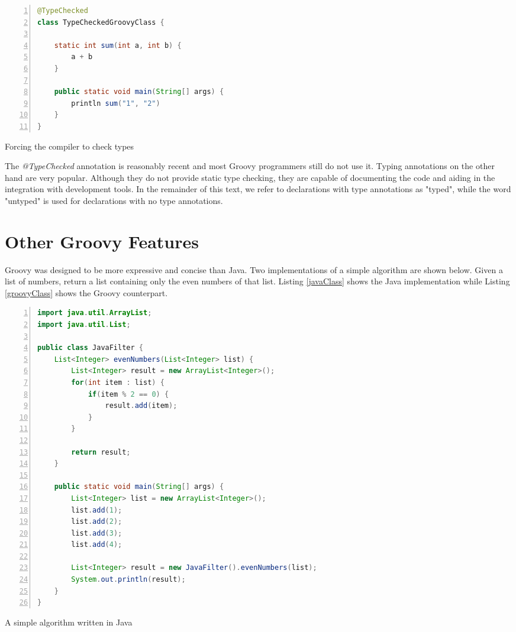 \documentclass[msc]{ppgccufmg}
\begin{document}
\begin{Listing}[ht]
\begin{lstlisting}[basicstyle=\ttfamily, language=Java,tabsize=2,breaklines=true,numbers=left]
@TypeChecked
class TypeCheckedGroovyClass {
	
	static int sum(int a, int b) {
		a + b
	}

	public static void main(String[] args) {
		println sum("1", "2")
	}
}
\end{lstlisting}
\caption{Forcing the compiler to check types}
\label{staticTyping}
\end{Listing}

The \emph{@TypeChecked} annotation is reasonably recent and most Groovy programmers still do not use it. 
Typing annotations on the other hand are very popular.
Although they do not provide static type checking, they are capable of documenting the code and aiding in the integration with development tools.
In the remainder of this text, we refer to declarations with type annotations as "typed", while the word "untyped" is used for declarations with no type annotations.

\section{Other Groovy Features}
Groovy was designed to be more expressive and concise than Java.
Two implementations of a simple algorithm are shown below.
Given a list of numbers, return a list containing only the even numbers of that list.
Listing \ref{javaClass} shows the Java implementation while Listing \ref{groovyClass} shows the Groovy counterpart. 


\begin{Listing}[ht]
\begin{lstlisting}[basicstyle=\ttfamily, language=Java,tabsize=2,breaklines=true,numbers=left]
import java.util.ArrayList;
import java.util.List;

public class JavaFilter {
	List<Integer> evenNumbers(List<Integer> list) {
		List<Integer> result = new ArrayList<Integer>();
		for(int item : list) {
			if(item % 2 == 0) {
				result.add(item);
			}
		}

		return result;
	}

	public static void main(String[] args) {
		List<Integer> list = new ArrayList<Integer>();
		list.add(1);
		list.add(2);
		list.add(3);
		list.add(4);

		List<Integer> result = new JavaFilter().evenNumbers(list);
		System.out.println(result);
	}
}
\end{lstlisting}
\caption{A simple algorithm written in Java}
\label{javaClass}
\end{Listing}
\end{document}
